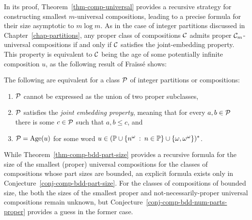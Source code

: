 In its proof, Theorem~\ref{thm-comp-universal} provides a recursive strategy for constructing smallest $m$-universal compositions, leading to a precise formula for their size asymptotic to $m \log m$. As in the case of integer partitions discussed in Chapter~\ref{chap-partitions}, any proper class of compositions $\C$ admits proper $\C_m$-universal compositions if and only if $\C$ satisfies the joint-embedding property. This property is equivalent to $\C$ being the age of some potentially infinite composition $u$, as the following result of Fra{\"i}ss{\'e} shows:

\begin{theorem} 
	The following are equivalent for a class $\P$ of integer partitions or compositions:
	\begin{enumerate}
		\item $\P$ cannot be expressed as the union of two proper subclasses,
		\item $\P$ satisfies the \emph{joint embedding property}, meaning that for every $a, b \in \P$ there is some $c \in \P$ such that $a, b \le c$, and 
		\item $\P = \Age(u)$ for some word $u \in (\mathbb{P} \cup \{n^\omega \st n \in \mathbb{P}\} \cup \{\omega, \omega^\omega\})^\ast$.
	\end{enumerate}
\end{theorem}

While Theorem~\ref{thm-comp-bdd-part-size} provides a recursive formula for the size of the smallest (proper) universal compositions for the classes of compositions whose part sizes are bounded, an explicit formula exists only in Conjecture~\ref{conj-comp-bdd-part-size}. For the classes of compositions of bounded size, the both the sizes of the smallest proper and not-necessarily-proper universal compositions remain unknown, but Conjecture~\ref{conj-comp-bdd-num-parts-proper} provides a guess in the former case.